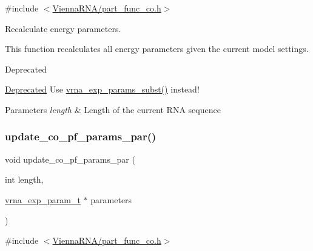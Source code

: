 {\ttfamily \#include $<$\mbox{\hyperlink{part__func__co_8h}{Vienna\+R\+N\+A/part\+\_\+func\+\_\+co.\+h}}$>$}



Recalculate energy parameters. 

This function recalculates all energy parameters given the current model settings.

\begin{DoxyRefDesc}{Deprecated}
\item[\mbox{\hyperlink{deprecated__deprecated000119}{Deprecated}}]Use \mbox{\hyperlink{group__energy__parameters_ga8e7ac4fab3b0cc03afbc134eaafb3525}{vrna\+\_\+exp\+\_\+params\+\_\+subst()}} instead!\end{DoxyRefDesc}



\begin{DoxyParams}{Parameters}
{\em length} & Length of the current R\+NA sequence \\
\hline
\end{DoxyParams}
\mbox{\label{group__part__func__global__deprecated_ga75465d7e8793db68a434d83df9a2e794}} 
\subsubsection{\texorpdfstring{update\_co\_pf\_params\_par()}{update\_co\_pf\_params\_par()}}
{\footnotesize\ttfamily void update\+\_\+co\+\_\+pf\+\_\+params\+\_\+par (\begin{DoxyParamCaption}\item[{int}]{length,  }\item[{\mbox{\hyperlink{group__energy__parameters_ga01d8b92fe734df8d79a6169482c7d8d8}{vrna\+\_\+exp\+\_\+param\+\_\+t}} $\ast$}]{parameters }\end{DoxyParamCaption})}



{\ttfamily \#include $<$\mbox{\hyperlink{part__func__co_8h}{Vienna\+R\+N\+A/part\+\_\+func\+\_\+co.\+h}}$>$}



